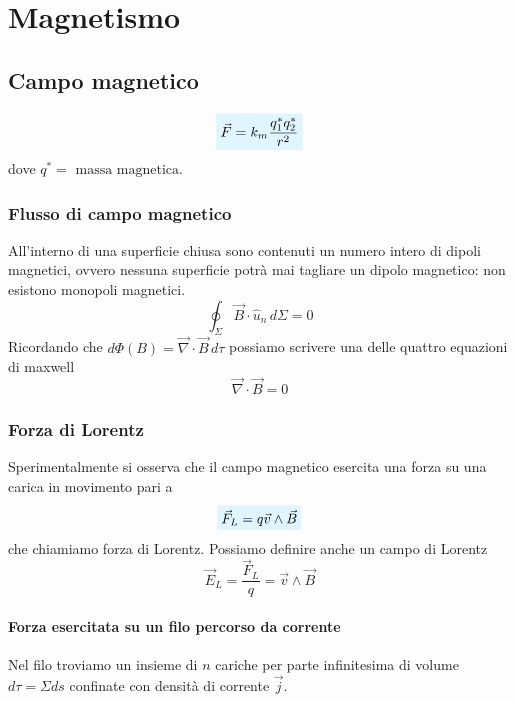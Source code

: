 \documentclass[x11names]{report}
\newcommand{\viola}[1]{%
	\colorbox{myblue}{$\displaystyle #1$}
}
\begin{document}
\chapter{Magnetismo}


\section{Campo magnetico}


\begin{equation}
	\viola{\vec{F} = k_m\frac{q_{1}^{*}q_{2}^{*}}{r^2}}
\end{equation}
dove \(q^{*} = \text{ massa magnetica}\).

\subsection{Flusso di campo magnetico}
All'interno di una superficie chiusa sono contenuti un numero intero di dipoli magnetici, ovvero nessuna superficie potrà mai tagliare un dipolo magnetico: non esistono monopoli magnetici.
\[
\oint_\Sigma \vec{B}\cdot \hat{u}_n \, d\Sigma = 0
\]
Ricordando che \(d\Phi(B) = \vec{\nabla} \cdot \vec{B} \, d\tau\) possiamo scrivere una delle quattro equazioni di maxwell
\begin{equation}
	\vec{\nabla} \cdot \vec{B}  = 0
\end{equation}
\subsection{Forza di Lorentz}
Sperimentalmente si osserva che il campo magnetico esercita una forza su una carica in movimento pari a
\begin{equation}
	\viola{\vec{F}_L = q\vec{v} \wedge \vec{B}}
\end{equation}
che chiamiamo forza di Lorentz. Possiamo definire anche un campo di Lorentz
\[
\vec{E}_L = \frac{\vec{F}_L}{q} = \vec{v} \wedge \vec{B}
\]
\subsubsection{Forza esercitata su un filo percorso da corrente}
Nel filo troviamo un insieme  di \(n\) cariche per parte infinitesima di volume \(d\tau = \Sigma ds\) confinate con densità di corrente \(\vec{j}\).
\end{document}

